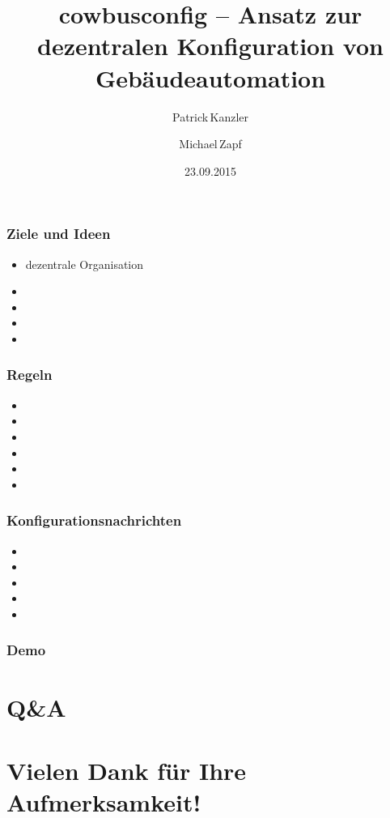 \documentclass{beamer}
\title{cowbusconfig – Ansatz zur dezentralen Konfiguration von Gebäudeautomation}
\author[P. Kanzler, M. Zapf]{Patrick\,Kanzler \and Michael\,Zapf}
\date{23.09.2015}
\begin{document}
\frame{\titlepage}

\begin{frame}
    \frametitle{Ziele und Ideen}

    \begin{itemize}
        \item dezentrale Organisation
        \item
        \item
        \item
        \item
    \end{itemize}
\end{frame}

\begin{frame}
    \frametitle{Regeln}

    \begin{itemize}
        \item 
        \item
        \item
        \item
        \item
        \item
    \end{itemize}
\end{frame}

\begin{frame}
    \frametitle{Konfigurationsnachrichten}

    \begin{itemize}
        \item
        \item
        \item
        \item
        \item
    \end{itemize}
\end{frame}

\begin{frame}
    \frametitle{Demo}
\end{frame}

\section{Q\&A}

\section{Vielen Dank für Ihre Aufmerksamkeit!}



\end{document}
